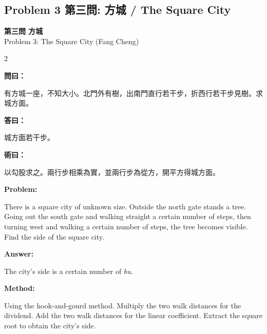 \documentclass[11pt,a4paper]{article}
\newcommand{\wen}{\textbf{\color{sectioncolor}問}}
\newcommand{\da}{\textbf{\color{answercolor}答}}
\newcommand{\shu}{\textbf{\color{methodcolor}術}}
\newcommand{\prob}{\textbf{\color{sectioncolor}Problem}}
\newcommand{\ans}{\textbf{\color{answercolor}Answer}}
\newcommand{\meth}{\textbf{\color{methodcolor}Method}}
\newcommand{\probheader}[2]{%
  \begin{center}
  \colorbox{problembg}{\parbox{\dimexpr\linewidth-4pt}{%
    \centering\smallskip
    {\large\bfseries\color{sectioncolor}#1}\\[0.3em]
    {\normalsize\color{subsectioncolor}#2}%
    \smallskip
  }}
  \end{center}
  \vspace{0.5em}
}
\newenvironment{zhanswer}{%
  \medskip\noindent{\color{answercolor}\rule{0.9\columnwidth}{0.4pt}}%
  \par\color{answercolor}\small
}{\par\medskip}
\newenvironment{enanswer}{%
  \medskip\noindent{\color{answercolor}\rule{0.9\columnwidth}{0.4pt}}%
  \par\color{answercolor}\small
}{\par\medskip}
\newenvironment{zhmethod}{%
  \medskip\noindent{\color{methodcolor}\rule{0.9\columnwidth}{0.4pt}}%
  \par\color{methodcolor}\small
}{\par\medskip}
\newenvironment{enmethod}{%
  \medskip\noindent{\color{methodcolor}\rule{0.9\columnwidth}{0.4pt}}%
  \par\color{methodcolor}\small
}{\par\medskip}
\begin{document}
\newpage

\subsection*{Problem 3 第三問: 方城 / The Square City}

\probheader{第三問 方城}{Problem 3: The Square City (Fang Cheng)}

\begin{paracol}{2}

\switchcolumn[0]
\noindent\wen\textbf{曰：}

有方城一座，不知大小。北門外有樹，出南門直行若干步，折西行若干步見樹。求城方面。

\begin{zhanswer}
\noindent\da\textbf{曰：}

城方面若干步。
\end{zhanswer}

\begin{zhmethod}
\noindent\shu\textbf{曰：}

以勾股求之。兩行步相乘為實，並兩行步為從方，開平方得城方面。
\end{zhmethod}

\switchcolumn[1]
\noindent\prob\textbf{:}

There is a square city of unknown size. Outside the north gate stands a tree. Going out the south gate and walking straight a certain number of steps, then turning west and walking a certain number of steps, the tree becomes visible. Find the side of the square city.
\begin{enanswer}
\noindent\ans\textbf{:}

The city's side is a certain number of \textit{bu}.
\end{enanswer}

\begin{enmethod}
\noindent\meth\textbf{:}

Using the hook-and-gourd method. Multiply the two walk distances for the dividend. Add the two walk distances for the linear coefficient. Extract the square root to obtain the city's side.
\end{enmethod}

\end{paracol}

\vspace{0.5em}
\end{document}
